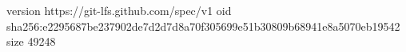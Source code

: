 version https://git-lfs.github.com/spec/v1
oid sha256:e2295687be237902de7d2d7d8a70f305699e51b30809b68941e8a5070eb19542
size 49248
